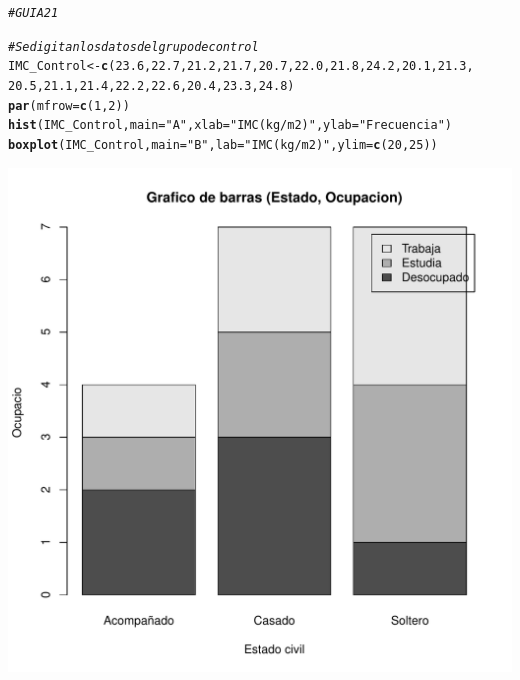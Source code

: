 \documentclass{article}\usepackage[]{graphicx}\usepackage[]{color}
\makeatletter
\def\maxwidth{ %
  \ifdim\Gin@nat@width>\linewidth
    \linewidth
  \else
    \Gin@nat@width
  \fi
}
\newcommand{\hlnum}[1]{\textcolor[rgb]{0.686,0.059,0.569}{#1}}%
\newcommand{\hlstr}[1]{\textcolor[rgb]{0.192,0.494,0.8}{#1}}%
\newcommand{\hlcom}[1]{\textcolor[rgb]{0.678,0.584,0.686}{\textit{#1}}}%
\newcommand{\hlstd}[1]{\textcolor[rgb]{0.345,0.345,0.345}{#1}}%
\newcommand{\hlkwb}[1]{\textcolor[rgb]{0.69,0.353,0.396}{#1}}%
\newcommand{\hlkwc}[1]{\textcolor[rgb]{0.333,0.667,0.333}{#1}}%
\newcommand{\hlkwd}[1]{\textcolor[rgb]{0.737,0.353,0.396}{\textbf{#1}}}%
\newenvironment{kframe}{%
 \def\at@end@of@kframe{}%
 \ifinner\ifhmode%
  \def\at@end@of@kframe{\end{minipage}}%
  \begin{minipage}{\columnwidth}%
 \fi\fi%
 \def\FrameCommand##1{\hskip\@totalleftmargin \hskip-\fboxsep
 \colorbox{shadecolor}{##1}\hskip-\fboxsep
     \hskip-\linewidth \hskip-\@totalleftmargin \hskip\columnwidth}%
 \MakeFramed {\advance\hsize-\width
   \@totalleftmargin\z@ \linewidth\hsize
   \@setminipage}}%
 {\par\unskip\endMakeFramed%
 \at@end@of@kframe}
\newenvironment{knitrout}{}{} %
\makeatother
\begin{document}
\begin{knitrout}
\color{fgcolor}\begin{kframe}
\begin{alltt}
\hlcom{# GUIA 21 }

\hlcom{#Se digitan los datos del grupo de control }
\hlstd{IMC_Control} \hlkwb{<-} \hlkwd{c}\hlstd{(}\hlnum{23.6}\hlstd{,} \hlnum{22.7}\hlstd{,} \hlnum{21.2}\hlstd{,} \hlnum{21.7}\hlstd{,} \hlnum{20.7}\hlstd{,} \hlnum{22.0}\hlstd{,} \hlnum{21.8}\hlstd{,} \hlnum{24.2}\hlstd{,} \hlnum{20.1}\hlstd{,} \hlnum{21.3}\hlstd{,}
                 \hlnum{20.5}\hlstd{,} \hlnum{21.1}\hlstd{,} \hlnum{21.4}\hlstd{,} \hlnum{22.2}\hlstd{,} \hlnum{22.6}\hlstd{,} \hlnum{20.4}\hlstd{,} \hlnum{23.3}\hlstd{,} \hlnum{24.8}\hlstd{)}
\hlkwd{par}\hlstd{(}\hlkwc{mfrow}\hlstd{=}\hlkwd{c}\hlstd{(}\hlnum{1}\hlstd{,}\hlnum{2}\hlstd{))}
\hlkwd{hist}\hlstd{(IMC_Control,}\hlkwc{main}\hlstd{=}\hlstr{"A"}\hlstd{,}\hlkwc{xlab}\hlstd{=}\hlstr{"IMC (kg/m2)"}\hlstd{,}\hlkwc{ylab}\hlstd{=}\hlstr{"Frecuencia"}\hlstd{)}
\hlkwd{boxplot}\hlstd{(IMC_Control,}\hlkwc{main}\hlstd{=}\hlstr{"B"}\hlstd{,} \hlkwc{lab}\hlstd{=}\hlstr{"IMC (kg/m2)"}\hlstd{,}\hlkwc{ylim}\hlstd{=}\hlkwd{c}\hlstd{(}\hlnum{20}\hlstd{,}\hlnum{25}\hlstd{))}
\end{alltt}
\end{kframe}
\includegraphics[width=\maxwidth]{figure/unnamed-chunk-1-1} 

\end{knitrout}
\end{document}
